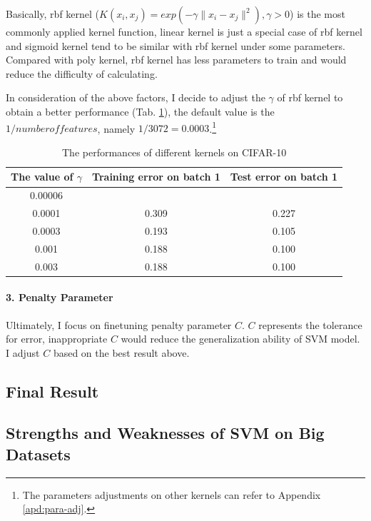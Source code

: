 \documentclass[12pt,a4paper]{article}
\theoremstyle{definition}
\begin{document}
Basically, rbf kernel ($K(x_i, x_j)=exp(-\gamma\|x_i-x_j\|^2), \gamma>0$) is the most commonly applied kernel function, linear kernel is just a special case of rbf kernel and sigmoid kernel tend to be similar with rbf kernel under some parameters. Compared with poly kernel, rbf kernel has less parameters to train and would reduce the difficulty of calculating.

\vspace{0.01\linewidth}
In consideration of the above factors, I decide to adjust the $\gamma$ of rbf kernel to obtain a better performance (Tab. \ref{tab:rbf-para}), the default value is the $1/number of features$, namely $1/3072=0.0003$.\footnote{The parameters adjustments on other kernels can refer to Appendix \ref{apd:para-adj}.}

\begin{table}[H]
	\renewcommand\arraystretch{1.35}
	\caption{The performances of different kernels on CIFAR-10}
	\label{tab:rbf-para}
	\centering
	
	\begin{tabular}{c|c|c}
		\centering
		The value of $\gamma$ & Training error on batch 1& Test error on batch 1 \\
		\hline
		\hline
		
		0.00006 & & \\
		0.0001 & 0.309 & 0.227 \\
		0.0003 & 0.193 & 0.105 \\
		0.001 & 0.188 & 0.100 \\
		0.003 & 0.188 & 0.100 \\
	\end{tabular}
\end{table}

\paragraph{3. Penalty Parameter}

Ultimately, I focus on finetuning penalty parameter $C$. $C$ represents the tolerance for error, inappropriate $C$ would reduce the generalization ability of SVM model. I adjust $C$ based on the best result above.

\subsection{Final Result}

\subsection{Strengths and Weaknesses of SVM on Big Datasets}
\end{document}
